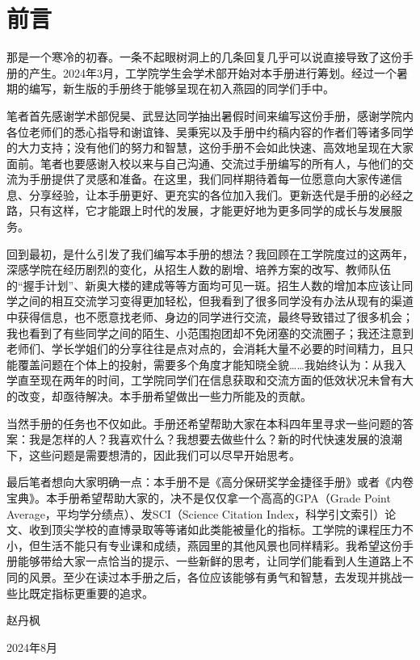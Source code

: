 \documentclass[11pt,oneside]{book}
\begin{document}



\frontmatter
\chapter*{前言}
那是一个寒冷的初春。一条不起眼树洞上的几条回复几乎可以说直接导致了这份手册的产生。2024年3月，工学院学生会学术部开始对本手册进行筹划。经过一个暑期的编写，新生版的手册终于能够呈现在初入燕园的同学们手中。

笔者首先感谢学术部倪昊、武昱达同学抽出暑假时间来编写这份手册，感谢学院内各位老师们的悉心指导和谢谊锋、吴秉宪以及手册中约稿内容的作者们等诸多同学的大力支持；没有他们的努力和智慧，这份手册不会如此快速、高效地呈现在大家面前。笔者也要感谢入校以来与自己沟通、交流过手册编写的所有人，与他们的交流为手册提供了灵感和准备。在这里，我们同样期待着每一位愿意向大家传递信息、分享经验，让本手册更好、更充实的各位加入我们。更新迭代是手册的必经之路，只有这样，它才能跟上时代的发展，才能更好地为更多同学的成长与发展服务。

回到最初，是什么引发了我们编写本手册的想法？我回顾在工学院度过的这两年，深感学院在经历剧烈的变化，从招生人数的剧增、培养方案的改写、教师队伍的“握手计划”、新奥大楼的建成等等方面均可见一斑。招生人数的增加本应该让同学之间的相互交流学习变得更加轻松，但我看到了很多同学没有办法从现有的渠道中获得信息，也不愿意找老师、身边的同学进行交流，最终导致错过了很多机会；我也看到了有些同学之间的陌生、小范围抱团却不免闭塞的交流圈子；我还注意到老师们、学长学姐们的分享往往是点对点的，会消耗大量不必要的时间精力，且只能覆盖问题在个体上的投射，需要多个角度才能知晓全貌……我始终认为：从我入学直至现在两年的时间，工学院同学们在信息获取和交流方面的低效状况未曾有大的改变，却亟待解决。本手册希望做出一些力所能及的贡献。

当然手册的任务也不仅如此。手册还希望帮助大家在本科四年里寻求一些问题的答案：我是怎样的人？我喜欢什么？我想要去做些什么？新的时代快速发展的浪潮下，这些问题是需要想清的，因此我们可以尽早开始思考。

最后笔者想向大家明确一点：本手册不是《高分保研奖学金捷径手册》或者《内卷宝典》。本手册希望帮助大家的，决不是仅仅拿一个高高的GPA（Grade Point Average，平均学分绩点）、发SCI（Science Citation Index，科学引文索引）论文、收到顶尖学校的直博录取等等诸如此类能被量化的指标。工学院的课程压力不小，但生活不能只有专业课和成绩，燕园里的其他风景也同样精彩。我希望这份手册能够带给大家一点恰当的提示、一些新鲜的思考，让同学们能看到人生道路上不同的风景。至少在读过本手册之后，各位应该能够有勇气和智慧，去发现并挑战一些比既定指标更重要的追求。
\begin{flushright}
    赵丹枫
    
    2024年8月
\end{flushright}
\end{document}
